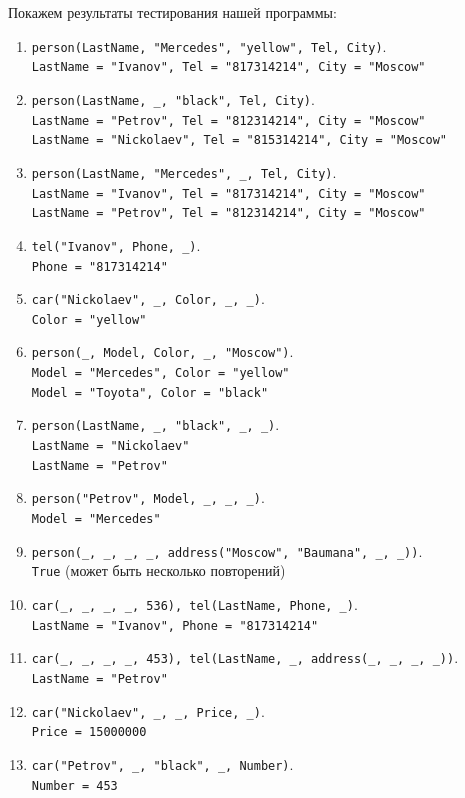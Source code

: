 \documentclass[12pt]{report}
\begin{document}
Покажем результаты тестирования нашей программы:
\begin{enumerate}
	\item \texttt{person(LastName, "Mercedes", "yellow", Tel, City)}. \\
	\texttt{LastName = "Ivanov", Tel = "817314214", City = "Moscow"}
	\item \texttt{person(LastName, \_, "black", Tel, City)}. \\
	\texttt{LastName = "Petrov", Tel = "812314214", City = "Moscow"} \\
	\texttt{LastName = "Nickolaev", Tel = "815314214", City = "Moscow"}
	\item \texttt{person(LastName, "Mercedes", \_, Tel, City)}. \\
	\texttt{LastName = "Ivanov", Tel = "817314214", City = "Moscow"} \\
	\texttt{LastName = "Petrov", Tel = "812314214", City = "Moscow"}
	\item \texttt{tel("Ivanov", Phone, \_)}. \\
	\texttt{Phone = "817314214"}
	\item \texttt{car("Nickolaev", \_, Color, \_, \_)}. \\
	\texttt{Color = "yellow"}
	\item \texttt{person(\_, Model, Color, \_, "Moscow")}. \\
	\texttt{Model = "Mercedes", Color = "yellow"} \\
	\texttt{Model = "Toyota", Color = "black"}
	\item \texttt{person(LastName, \_, "black", \_, \_)}. \\
	\texttt{LastName = "Nickolaev"} \\
	\texttt{LastName = "Petrov"}
	\item \texttt{person("Petrov", Model, \_, \_, \_)}. \\
	\texttt{Model = "Mercedes"}
	\item \texttt{person(\_, \_, \_, \_, address("Moscow", "Baumana", \_, \_))}. \\
	\texttt{True} (может быть несколько повторений)
	\item \texttt{car(\_, \_, \_, \_, 536), tel(LastName, Phone, \_)}. \\
	\texttt{LastName = "Ivanov", Phone = "817314214"}
	\item \texttt{car(\_, \_, \_, \_, 453), tel(LastName, \_, address(\_, \_, \_, \_))}. \\
	\texttt{LastName = "Petrov"}
	\item \texttt{car("Nickolaev", \_, \_, Price, \_)}. \\
	\texttt{Price = 15000000}
	\item \texttt{car("Petrov", \_, "black", \_, Number)}. \\
	\texttt{Number = 453}
\end{enumerate}


	
\end{document}
